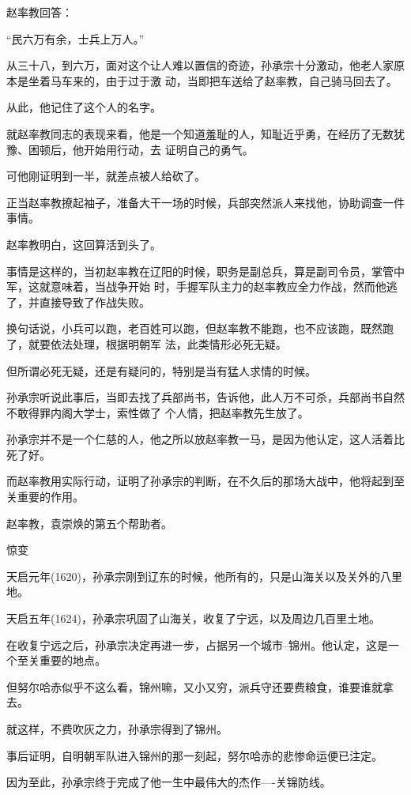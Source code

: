 \documentclass[11pt,a4paper,onecolumn]{article}
\begin{document}
赵率教回答：

``民六万有余，士兵上万人。''

从三十八，到六万，面对这个让人难以置信的奇迹，孙承宗十分激动，他老人家原本是坐着马车来的，由于过于激
动，当即把车送给了赵率教，自己骑马回去了。

从此，他记住了这个人的名字。

就赵率教同志的表现来看，他是一个知道羞耻的人，知耻近乎勇，在经历了无数犹豫、困顿后，他开始用行动，去
证明自己的勇气。

可他刚证明到一半，就差点被人给砍了。

正当赵率教撩起袖子，准备大干一场的时候，兵部突然派人来找他，协助调查一件事情。

赵率教明白，这回算活到头了。

事情是这样的，当初赵率教在辽阳的时候，职务是副总兵，算是副司令员，掌管中军，这就意味着，当战争开始
时，手握军队主力的赵率教应全力作战，然而他逃了，并直接导致了作战失败。

换句话说，小兵可以跑，老百姓可以跑，但赵率教不能跑，也不应该跑，既然跑了，就要依法处理，根据明朝军
法，此类情形必死无疑。

但所谓必死无疑，还是有疑问的，特别是当有猛人求情的时候。

孙承宗听说此事后，当即去找了兵部尚书，告诉他，此人万不可杀，兵部尚书自然不敢得罪内阁大学士，索性做了
个人情，把赵率教先生放了。

孙承宗并不是一个仁慈的人，他之所以放赵率教一马，是因为他认定，这人活着比死了好。

而赵率教用实际行动，证明了孙承宗的判断，在不久后的那场大战中，他将起到至关重要的作用。

赵率教，袁崇焕的第五个帮助者。

惊变

天启元年(1620)，孙承宗刚到辽东的时候，他所有的，只是山海关以及关外的八里地。

天启五年(1624)，孙承宗巩固了山海关，收复了宁远，以及周边几百里土地。

在收复宁远之后，孙承宗决定再进一步，占据另一个城市--锦州。他认定，这是一个至关重要的地点。

但努尔哈赤似乎不这么看，锦州嘛，又小又穷，派兵守还要费粮食，谁要谁就拿去。

就这样，不费吹灰之力，孙承宗得到了锦州。

事后证明，自明朝军队进入锦州的那一刻起，努尔哈赤的悲惨命运便已注定。

因为至此，孙承宗终于完成了他一生中最伟大的杰作----关锦防线。

\section[\thesection]{}
\end{document}
